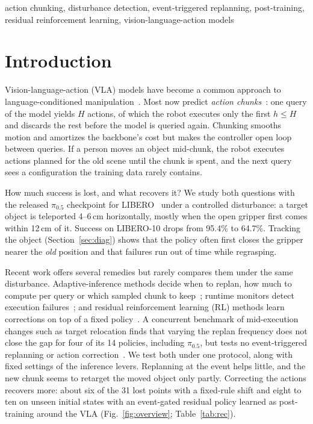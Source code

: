 \documentclass[conference,a4paper]{IEEEtran}
\begin{document}
\begin{IEEEkeywords}
action chunking, disturbance detection, event-triggered replanning,
post-training, residual reinforcement learning, vision-language-action models
\end{IEEEkeywords}

\section{Introduction}

Vision-language-action (VLA) models have become a common approach to
language-conditioned manipulation~\cite{kim2024openvla,black2024pi0,pi05}.
Most now predict \emph{action chunks}~\cite{zhao2023act,chi2025diffusion}:
one query of the model yields $H$ actions, of which the robot
executes only the first $h\le H$ and discards the rest before the model is queried again. Chunking smooths motion and amortizes the backbone's cost but makes the
controller open loop between queries. If a person moves an object
mid-chunk, the robot executes actions planned for the old scene
until the chunk is spent, and the next query sees a configuration the training data
rarely contains.



How much success is lost, and what recovers it? We study both questions with the
released $\pi_{0.5}$ checkpoint for LIBERO~\cite{pi05,liu2023libero} under
a controlled disturbance: a target object is teleported 4\nobreakdash--6\,cm horizontally, mostly when the open gripper first comes within 12\,cm of it.
Success on LIBERO-10 drops from 95.4\% to 64.7\%. Tracking the object
(Section~\ref{sec:diag}) shows that the policy often first closes the gripper nearer the \emph{old} position and that failures run out of time while regrasping.

Recent work offers several remedies but rarely compares them under the same disturbance. Adaptive-inference methods decide
when to replan, how much to compute per query or which sampled chunk to keep~\cite{liang2026aac,pan2026corrector,chun2025dasip,liu2025bid}; runtime
monitors detect execution failures~\cite{agia2024sentinel,xu2025faildetect,gu2025safe};
and residual reinforcement learning (RL) methods learn corrections on top of a fixed policy~\cite{yuan2025decorator,xiao2025pld}.
A concurrent benchmark of mid-execution changes such as target relocation finds that varying the replan frequency does not close the gap for four of its 14 policies, including $\pi_{0.5}$, but tests no event-triggered replanning or action correction~\cite{zhang2026liberomax}. We test both under one protocol, along with fixed settings of the inference levers. Replanning at the event helps little, and the new chunk seems to retarget the moved object only partly. Correcting the actions recovers more: about six of the 31 lost points with a fixed-rule shift and eight to ten on unseen initial states with an event-gated residual policy learned as post-training around the VLA (Fig.~\ref{fig:overview}; Table~\ref{tab:rec}).
\end{document}
